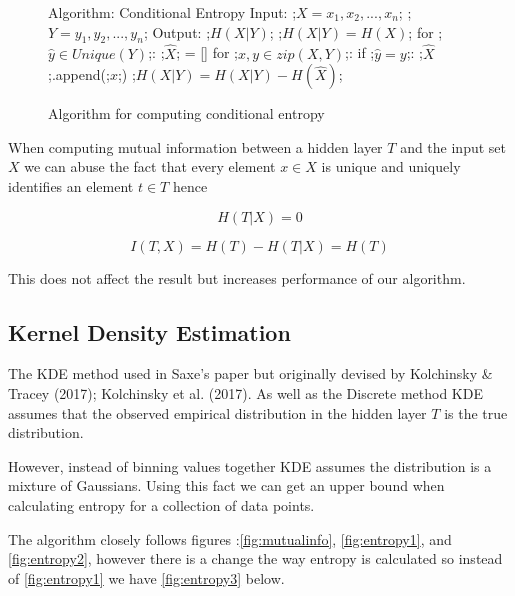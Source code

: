 \documentclass[dissertation.tex]{subfiles}
\begin{document}
\begin{figure}[H]
    \begin{pythonfigure}
      Algorithm: Conditional Entropy
      Input: 
      ;$X = x_1, x_2,...,x_n$;
      ;$Y = y_1, y_2,...,y_n$;
      Output: ;$H(X|Y)$;
      ;$H(X|Y) = H(X)$;
      for ;$ \hat{y}\in Unique(Y)$;:
        ;$\hat{X}$; = []
        for ;$x, y \in zip(X, Y)$;:
          if ;$\hat{y} = y$;:
            ;$\hat{X}$;.append(;$x$;)
          ;$H(X|Y) = H(X|Y) - H(\hat{X})$;
    \end{pythonfigure}
    \caption{Algorithm for computing conditional entropy}
    \label{fig:entropy2}
\end{figure}

When computing mutual information between a hidden layer $T$ and the input set
$X$ we can abuse the fact that every element $x\in X$ is unique and uniquely
identifies an element $t\in T$ hence 

\begin{equation}
  H(T|X) = 0 
\end{equation}

\begin{equation}
  I(T, X) = H(T) - H(T|X) = H(T) 
\end{equation}

This does not affect the result but increases performance of our algorithm.

\subsection{Kernel Density Estimation}

  The KDE method used in Saxe's paper but originally devised by Kolchinsky \&
  Tracey (2017); Kolchinsky et al. (2017). As well as the Discrete method KDE
  assumes that the observed empirical distribution in the hidden layer $T$ is
  the true distribution. 

  However, instead of binning values together KDE assumes the distribution is a
  mixture of Gaussians. Using this fact we can get an upper bound when
  calculating entropy for a collection of data points.

  The algorithm closely follows figures :\autoref{fig:mutualinfo},
  \autoref{fig:entropy1}, and \autoref{fig:entropy2}, however there is a change
  the way entropy is calculated so instead of \autoref{fig:entropy1} we have
  \autoref{fig:entropy3} below.
\end{document}
